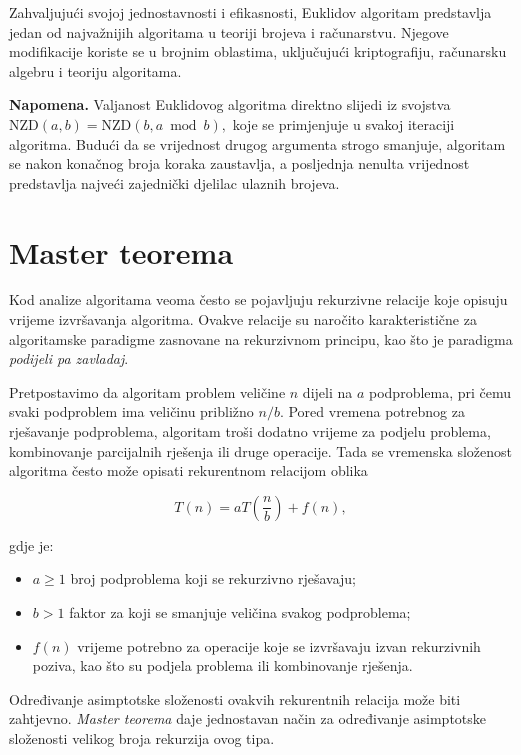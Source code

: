Zahvaljujući svojoj jednostavnosti i efikasnosti, Euklidov algoritam predstavlja jedan od najvažnijih algoritama u teoriji brojeva i računarstvu. Njegove modifikacije koriste se u brojnim oblastima, uključujući kriptografiju, računarsku algebru i teoriju algoritama.

\textbf{Napomena.}
Valjanost Euklidovog algoritma direktno slijedi iz svojstva $\text{NZD}(a,b)=\text{NZD}(b,a\bmod b),$ koje se primjenjuje u svakoj iteraciji algoritma. Budući da se vrijednost drugog argumenta strogo smanjuje, algoritam se nakon konačnog broja koraka zaustavlja, a posljednja nenulta vrijednost predstavlja najveći zajednički djelilac ulaznih brojeva.

\section{Master teorema}

Kod analize algoritama veoma često se pojavljuju rekurzivne relacije koje opisuju
vrijeme izvršavanja algoritma. Ovakve relacije su naročito karakteristične za
algoritamske paradigme zasnovane na rekurzivnom principu, kao što je paradigma
\emph{podijeli pa zavladaj}.

Pretpostavimo da algoritam problem veličine $n$ dijeli na $a$ podproblema,
pri čemu svaki podproblem ima veličinu približno $n/b$. Pored vremena potrebnog
za rješavanje podproblema, algoritam troši dodatno vrijeme za podjelu problema,
kombinovanje parcijalnih rješenja ili druge operacije. Tada se vremenska
složenost algoritma često može opisati rekurentnom relacijom oblika

\[
T(n)=aT\left(\frac{n}{b}\right)+f(n),
\]

gdje je:

\begin{itemize}
	\item $a \geq 1$ broj podproblema koji se rekurzivno rješavaju;
	\item $b > 1$ faktor za koji se smanjuje veličina svakog podproblema;
	\item $f(n)$ vrijeme potrebno za operacije koje se izvršavaju izvan
	rekurzivnih poziva, kao što su podjela problema ili kombinovanje rješenja.
\end{itemize}

Određivanje asimptotske složenosti ovakvih rekurentnih relacija može biti
zahtjevno. \emph{Master teorema} daje jednostavan način za određivanje
asimptotske složenosti velikog broja rekurzija ovog tipa.

